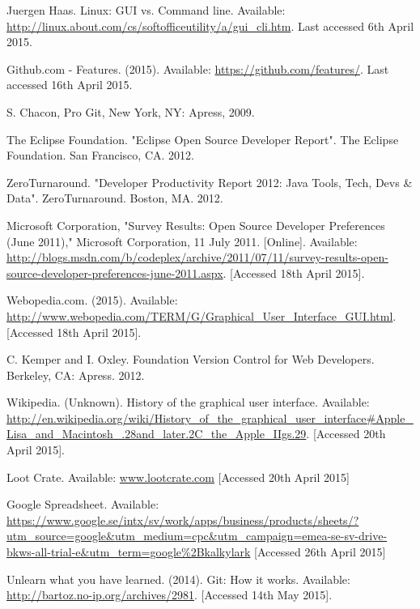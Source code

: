 \documentclass[a4paper,oneside]{bth} %
\begin{document}
\begin{thebibliography}{1}
			Juergen Haas. Linux: GUI vs. Command line. Available: \url{http://linux.about.com/cs/softofficeutility/a/gui\_cli.htm}. Last accessed 6th April 2015.
			
			Github.com - Features. (2015). Available: \url{https://github.com/features/}. Last accessed 16th April 2015.
			
			S. Chacon, Pro Git, New York, NY: Apress, 2009.
			
			The Eclipse Foundation. "Eclipse Open Source Developer Report". The Eclipse Foundation. San Francisco, CA. 2012.
			
			ZeroTurnaround. "Developer Productivity Report 2012: Java Tools, Tech, Devs \& Data". ZeroTurnaround. Boston, MA. 2012.
			
			Microsoft Corporation, "Survey Results: Open Source Developer Preferences (June 2011)," Microsoft Corporation, 11 July 2011. [Online]. Available: \url{http://blogs.msdn.com/b/codeplex/archive/2011/07/11/survey-results-open-source-developer-preferences-june-2011.aspx}. [Accessed 18th April 2015].
			
			Webopedia.com. (2015). Available: \url{http://www.webopedia.com/TERM/G/Graphical\_User\_Interface\_GUI.html}. [Accessed 18th April 2015].
			
			C. Kemper and I. Oxley. Foundation Version Control for Web Developers. Berkeley, CA: Apress. 2012.
			
			Wikipedia. (Unknown). History of the graphical user interface. Available: \url{http://en.wikipedia.org/wiki/History_of_the_graphical_user_interface#Apple_Lisa_and_Macintosh_.28and_later.2C_the_Apple_IIgs.29}.  [Accessed 20th April 2015].
			
			Loot Crate. Available: \url{www.lootcrate.com} [Accessed 20th April 2015]
			
			Google Spreadsheet. Available: \url{https://www.google.se/intx/sv/work/apps/business/products/sheets/?utm_source=google&utm_medium=cpc&utm_campaign=emea-se-sv-drive-bkws-all-trial-e&utm_term=google%2Bkalkylark} [Accessed 26th April 2015]
			
			Unlearn what you have learned. (2014). Git: How it works. Available: \url{http://bartoz.no-ip.org/archives/2981}. [Accessed 14th May 2015].
			

\end{thebibliography}
\end{document}

